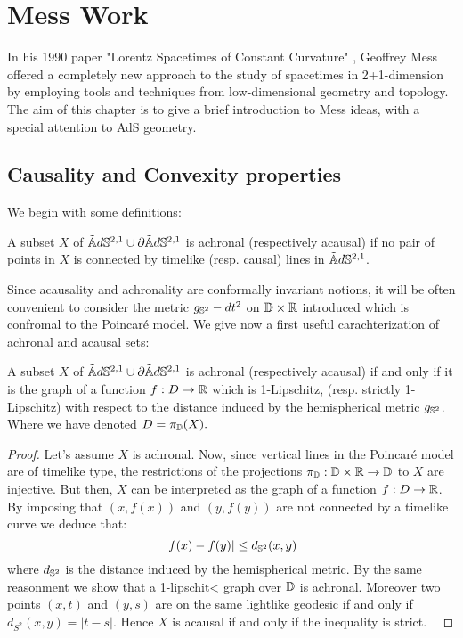 \chapter{Mess Work}

In his 1990 paper "Lorentz Spacetimes of Constant Curvature" \cite{Mess}, Geoffrey Mess offered a completely new approach to the study of spacetimes in 2+1-dimension by employing tools and techniques from low-dimensional geometry and topology. The aim of this chapter is to give a brief introduction to Mess ideas, with a special attention to AdS geometry. 

\section{Causality and Convexity properties}
We begin with some definitions:
\begin{definition}
    A subset $X$ of $\AS^{2,1}\cup \partial\AS^{2,1}$ is achronal (respectively acausal) if no pair of points in $X$ is connected by timelike (resp. causal) lines in $\AS^{2,1}$.
\end{definition}
Since acausality and achronality are conformally invariant notions, it will be often convenient to consider the metric $g_{\S^2}-dt^2$ on $\D\times\R$ introduced  which is confromal to the Poincaré model. We give now a first useful carachterization of achronal and acausal sets:
\begin{lemma}
    A subset $X$ of $\AS^{2,1}\cup \partial\AS^{2,1}$ is achronal (respectively acausal) if and only if it is the graph of a function $f:D\to\R$ which is 1-Lipschitz, (resp. strictly 1-Lipschitz) with respect to the distance induced by the hemispherical metric $g_{\S^2}$.\\
    Where we have denoted $D=\pi_{\D}(X).$ 
\end{lemma}
\begin{proof}
     Let's assume $X$ is achronal. Now, since vertical lines in the Poincaré model are of timelike type, the restrictions of the projections $\pi_\D:\D\times\R\to\D$ to $X$ are injective. But then, $X$ can be interpreted as the graph of a function $f:D\to\R$. By imposing that $(x,f(x))$ and $(y,f(y))$ are not connected by a timelike curve we deduce that: 
     \begin{equation}\label{soloqua}
        |f(x)-f(y)|\leq d_{\S^2}(x,y)
     \end{equation}
     where $d_{\S^2}$ is the distance induced by the hemispherical metric. By the same reasonment we show that a 1-lipschit< graph over $\D$ is achronal. Moreover two points $(x,t)$ and $(y,s)$ are on the same lightlike geodesic if and only if $d_{S^2}(x,y)=|t-s|$. Hence $X$ is acausal if and only if the inequality  is strict. \
\end{proof}

